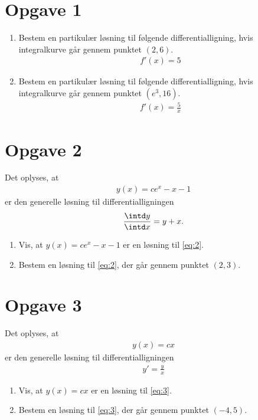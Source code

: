 \section*{Opgave 1}
\begin{enumerate}[label=\roman*)]
	\item Bestem en partikulær løsning til følgende differentialligning, hvis integralkurve
	går gennem punktet $(2,6)$. 
	\begin{align*}
		f'(x) = 5
	\end{align*}
	\item Bestem en partikulær løsning til følgende differentialligning, hvis integralkurve 
	går gennem punktet $(e^{3},16)$.
	\begin{align*}
		f'(x) = \frac{5}{x} 
	\end{align*}
\end{enumerate}

\section*{Opgave 2}
	Det oplyses, at 
	\begin{align*}
		y(x) = ce^x-x-1
	\end{align*}
	er den generelle løsning til differentialligningen
	\begin{align}\label{eq:2}
		\frac{\intd y}{\intd x} = y+x.
	\end{align}
\begin{enumerate}[label=\roman*)]
\item Vis, at $y(x) = ce^x -x-1$ er en løsning til \eqref{eq:2}.
\item Bestem en løsning til \eqref{eq:2}, der går gennem punktet $(2,3)$.
\end{enumerate}


\section*{Opgave 3}
	Det oplyses, at 
	\begin{align*}
		y(x) = cx
	\end{align*}
	er den generelle løsning til differentialligningen
	\begin{align}\label{eq:3}
		y' = \frac{y}{x}
	\end{align}
\begin{enumerate}[label=\roman*)]
\item Vis, at $y(x) = cx$ er en løsning til \eqref{eq:3}.
\item Bestem en løsning til \eqref{eq:3}, der går gennem punktet $(-4,5)$.
\end{enumerate}


